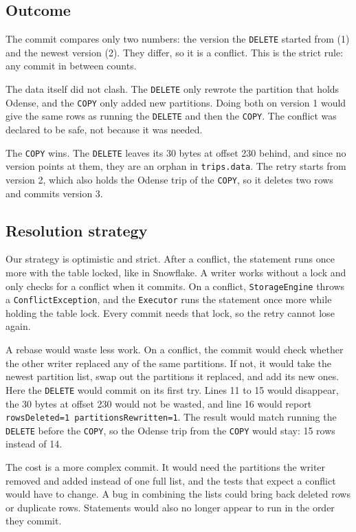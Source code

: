 \documentclass[11pt,a4paper,twocolumn]{article}
\begin{document}
\subsection{Outcome}

The commit compares only two numbers: the version the \texttt{DELETE} started from (1) and the newest version (2). They differ, so it is a conflict. This is the strict rule: any commit in between counts.

The data itself did not clash. The \texttt{DELETE} only rewrote the partition that holds Odense, and the \texttt{COPY} only added new partitions. Doing both on version 1 would give the same rows as running the \texttt{DELETE} and then the \texttt{COPY}. The conflict was declared to be safe, not because it was needed.

The \texttt{COPY} wins. The \texttt{DELETE} leaves its 30 bytes at offset 230 behind, and since no version points at them, they are an orphan in \texttt{trips.data}. The retry starts from version 2, which also holds the Odense trip of the \texttt{COPY}, so it deletes two rows and commits version 3.

\subsection{Resolution strategy}

Our strategy is optimistic and strict. After a conflict, the statement runs once more with the table locked, like in Snowflake. A writer works without a lock and only checks for a conflict when it commits. On a conflict, \texttt{StorageEngine} throws a \texttt{ConflictException}, and the \texttt{Executor} runs the statement once more while holding the table lock. Every commit needs that lock, so the retry cannot lose again.

A rebase would waste less work. On a conflict, the commit would check whether the other writer replaced any of the same partitions. If not, it would take the newest partition list, swap out the partitions it replaced, and add its new ones. Here the \texttt{DELETE} would commit on its first try. Lines 11 to 15 would disappear, the 30 bytes at offset 230 would not be wasted, and line 16 would report \texttt{rowsDeleted=1 partitionsRewritten=1}. The result would match running the \texttt{DELETE} before the \texttt{COPY}, so the Odense trip from the \texttt{COPY} would stay: 15 rows instead of 14.

The cost is a more complex commit. It would need the partitions the writer removed and added instead of one full list, and the tests that expect a conflict would have to change. A bug in combining the lists could bring back deleted rows or duplicate rows. Statements would also no longer appear to run in the order they commit.
\end{document}
